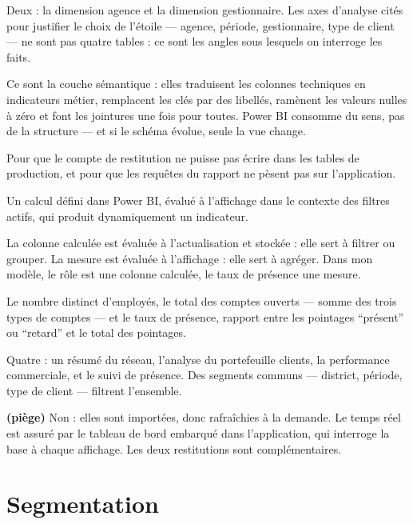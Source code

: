 \documentclass[a4paper,11pt]{article}
\begin{document}
Deux : la dimension agence et la dimension gestionnaire. Les axes d'analyse
cités pour justifier le choix de l'étoile --- agence, période, gestionnaire,
type de client --- ne sont pas quatre tables : ce sont les angles sous lesquels
on interroge les faits.

Ce sont la couche sémantique : elles traduisent les colonnes techniques en
indicateurs métier, remplacent les clés par des libellés, ramènent les valeurs
nulles à zéro et font les jointures une fois pour toutes. Power BI consomme du
sens, pas de la structure --- et si le schéma évolue, seule la vue change.

Pour que le compte de restitution ne puisse pas écrire dans les tables de
production, et pour que les requêtes du rapport ne pèsent pas sur l'application.

Un calcul défini dans Power BI, évalué à l'affichage dans le contexte des
filtres actifs, qui produit dynamiquement un indicateur.

La colonne calculée est évaluée à l'actualisation et stockée : elle sert à
filtrer ou grouper. La mesure est évaluée à l'affichage : elle sert à agréger.
Dans mon modèle, le rôle est une colonne calculée, le taux de présence une
mesure.

Le nombre distinct d'employés, le total des comptes ouverts --- somme des trois
types de comptes --- et le taux de présence, rapport entre les pointages
\enquote{présent} ou \enquote{retard} et le total des pointages.

Quatre : un résumé du réseau, l'analyse du portefeuille clients, la performance
commerciale, et le suivi de présence. Des segments communs --- district,
période, type de client --- filtrent l'ensemble.

 \textbf{(piège)}
Non : elles sont importées, donc rafraîchies à la demande. Le temps réel est
assuré par le tableau de bord embarqué dans l'application, qui interroge la base
à chaque affichage. Les deux restitutions sont complémentaires.

\section{Segmentation}
\end{document}
